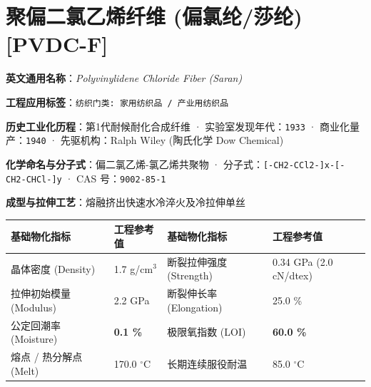 \documentclass[11pt,openright,twoside,UTF8]{ctexbook}
\begin{document}
\section{聚偏二氯乙烯纤维 (偏氯纶/莎纶) [PVDC-F]}
\label{sec:pvdc-f}

\noindent\textbf{英文通用名称}：\textit{Polyvinylidene Chloride Fiber (Saran)}\par
\noindent\textbf{工程应用标签}：\texttt{纺织门类: 家用纺织品 / 产业用纺织品}\par
\noindent\textbf{历史工业化历程}：第1代耐候耐化合成纤维 · 实验室发现年代：\texttt{1933} · 商业化量产：\texttt{1940} · 先驱机构：Ralph Wiley (陶氏化学 Dow Chemical)\par
\noindent\textbf{化学命名与分子式}：偏二氯乙烯-氯乙烯共聚物 · 分子式：\texttt{[-CH2-CCl2-]x-[-CH2-CHCl-]y} · CAS 号：\texttt{9002-85-1}\par
\noindent\textbf{成型与拉伸工艺}：熔融挤出快速水冷淬火及冷拉伸单丝\par

\vspace{0.15cm}
\begin{center}
\small
\begin{tabularx}{\textwidth}{p{3.8cm}Xp{3.8cm}X}
\toprule
\textbf{基础物化指标} & \textbf{工程参考值} & \textbf{基础物化指标} & \textbf{工程参考值} \\
\midrule
晶体密度 (Density) & 1.7 g/cm$^3$ & 断裂拉伸强度 (Strength) & 0.34 GPa (2.0 cN/dtex) \\
拉伸初始模量 (Modulus) & 2.2 GPa & 断裂伸长率 (Elongation) & 25.0 \% \\
公定回潮率 (Moisture) & \textbf{0.1 \%} & 极限氧指数 (LOI) & \textbf{60.0 \%} \\
熔点 / 热分解点 (Melt) & 170.0 $^\circ\mathrm{C}$ & 长期连续服役耐温 & 85.0 $^\circ\mathrm{C}$ \\
\bottomrule
\end{tabularx}
\end{center}
\vspace{0.15cm}
\end{document}
